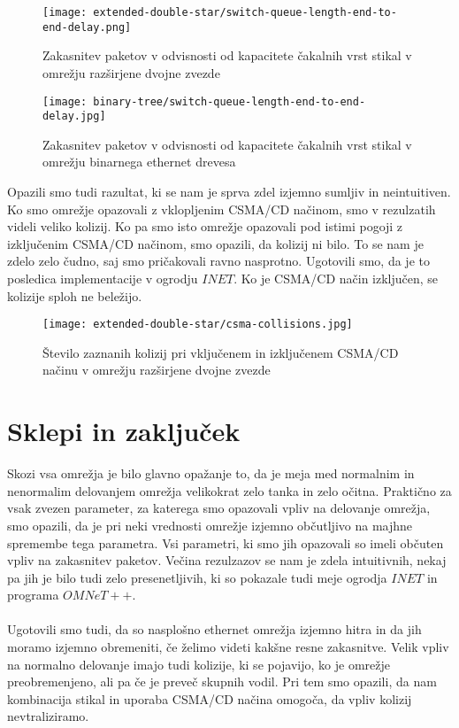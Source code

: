\begin{figure}[H]
    \centering
    \texttt{[image: extended-double-star/switch-queue-length-end-to-end-delay.png]}
    \caption{Zakasnitev paketov v odvisnosti od kapacitete čakalnih vrst stikal v omrežju razširjene dvojne zvezde}
    \label{fig:switch-queue-cap-end-to-end-delay-double-star}
\end{figure}

\begin{figure}[H]
    \centering
    \texttt{[image: binary-tree/switch-queue-length-end-to-end-delay.jpg]}
    \caption{Zakasnitev paketov v odvisnosti od kapacitete čakalnih vrst stikal v omrežju binarnega ethernet drevesa}
    \label{fig:switch-queue-cap-end-to-end-delay-binary-tree}
\end{figure}

Opazili smo tudi razultat, ki se nam je sprva zdel izjemno sumljiv in neintuitiven. Ko smo omrežje opazovali z vklopljenim CSMA/CD načinom, smo v rezulzatih videli veliko kolizij. Ko pa smo isto omrežje opazovali pod istimi pogoji z izključenim CSMA/CD načinom, smo opazili, da kolizij ni bilo. To se nam je zdelo zelo čudno, saj smo pričakovali ravno nasprotno. Ugotovili smo, da je to posledica implementacije v ogrodju $INET$. Ko je CSMA/CD način izključen, se kolizije sploh ne beležijo.

\begin{figure}[H]
    \centering
    \texttt{[image: extended-double-star/csma-collisions.jpg]}
    \caption{Število zaznanih kolizij pri vključenem in izključenem CSMA/CD načinu v omrežju razširjene dvojne zvezde}
    \label{fig:csma-cd-collisions-binary-tree}
\end{figure}

\section{Sklepi in zaključek}

Skozi vsa omrežja je bilo glavno opažanje to, da je meja med normalnim in nenormalim delovanjem omrežja velikokrat zelo tanka in zelo očitna. Praktično za vsak zvezen parameter, za katerega smo opazovali vpliv na delovanje omrežja, smo opazili, da je pri neki vrednosti omrežje izjemno občutljivo na majhne spremembe tega parametra. Vsi parametri, ki smo jih opazovali so imeli občuten vpliv na zakasnitev paketov. Večina rezulzazov se nam je zdela intuitivnih, nekaj pa jih je bilo tudi zelo presenetljivih, ki so pokazale tudi meje ogrodja $INET$ in programa $OMNeT++$.
\paragraph{}
Ugotovili smo tudi, da so nasplošno ethernet omrežja izjemno hitra in da jih moramo izjemno obremeniti, če želimo videti kakšne resne zakasnitve. Velik vpliv na normalno delovanje imajo tudi kolizije, ki se pojavijo, ko je omrežje preobremenjeno, ali pa če je preveč skupnih vodil. Pri tem smo opazili, da nam kombinacija stikal in uporaba CSMA/CD načina omogoča, da vpliv kolizij nevtraliziramo.
